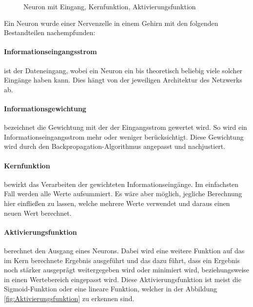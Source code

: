 \begin{figure}
\centering


	\caption{Neuron mit Eingang, Kernfunktion, Aktivierungsfunktion}
	\label{fig:Neuron}
\end{figure}

Ein Neuron wurde einer Nervenzelle in einem Gehirn mit den folgenden Bestandteilen nachempfunden:
\paragraph{Informationseingangsstrom} ist der Dateneingang, wobei ein Neuron ein bis theoretisch beliebig viele solcher Eingänge haben kann. 
Dies hängt von der jeweiligen Architektur des Netzwerks ab.

\paragraph{Informationsgewichtung} bezeichnet die Gewichtung mit der der Eingangsstrom gewertet wird. 
So wird ein Informationseingangsstrom mehr oder weniger berücksichtigt. 
Diese Gewichtung wird durch den Backpropagation-Algorithmus angepasst und nachjustiert.

\paragraph{Kernfunktion} bewirkt das Verarbeiten der gewichteten Informationseingänge. 
Im einfachsten Fall werden alle Werte aufsummiert. 
Es wäre aber möglich, jegliche Berechnung hier einfließen zu lassen, welche mehrere Werte verwendet und daraus einen neuen Wert berechnet.

\paragraph{Aktivierungsfunktion} berechnet den Ausgang eines Neurons. 
Dabei wird eine weitere Funktion auf das im Kern berechnete Ergebnis ausgeführt und das dazu führt, dass ein Ergebnis noch stärker ausgeprägt weitergegeben wird oder minimiert wird, beziehungsweise in einen Wertebereich eingepasst wird. 
Diese Aktivierungsfunktion ist meist die Sigmoid-Funktion oder eine lineare Funktion, welcher in der Abbildung \ref{fig:Aktivierungsfunktion} zu erkennen sind.

